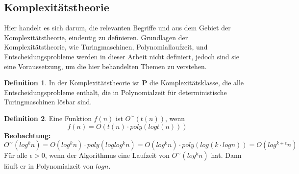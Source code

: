 \documentclass[12pt,oneside]{article}
\theoremstyle{remark}
\theoremstyle{definition}
\newtheorem{definition}{Definition}[section]
\begin{document}

\subsection{Komplexitätstheorie}

Hier handelt es sich darum, die relevanten Begriffe und aus dem Gebiet der Komplexitätstheorie, eindeutig zu definieren. Grundlagen der Komplexitätstheorie, wie Turingmaschinen, Polynomiallaufzeit, und Entscheidungsprobleme werden in dieser Arbeit nicht definiert, jedoch sind sie eine Voraussetzung, um die hier behandelten Themen zu verstehen.   

\begin{definition}
In der Komplexitätstheorie ist \textbf{P} die Komplexitätsklasse, die alle Entscheidungsprobleme enthält, die in Polynomialzeit für deterministische Turingmaschinen lösbar sind. 
\end{definition}

\begin{definition}
Eine Funktion $f(n)$ ist $ O^{\sim}(t(n))$, wenn
\begin{equation}
    f(n) = O(t(n) \cdot poly(log t(n)))
\end{equation}
\textbf{Beobachtung:}
\begin{equation}
    O^{\sim}(log^k n) = O(log^k n) \cdot poly(log log^k n) = O(log^k n) \cdot poly(log( k \cdot log n)) = O(log^{k+\epsilon}n)
\end{equation}
Für alle $\epsilon > 0$, wenn der Algorithmus eine Laufzeit von $O^{\sim}(log^k n)$ hat. Dann läuft er in Polynomialzeit von $log n$.
\end{definition}

\end{document}
